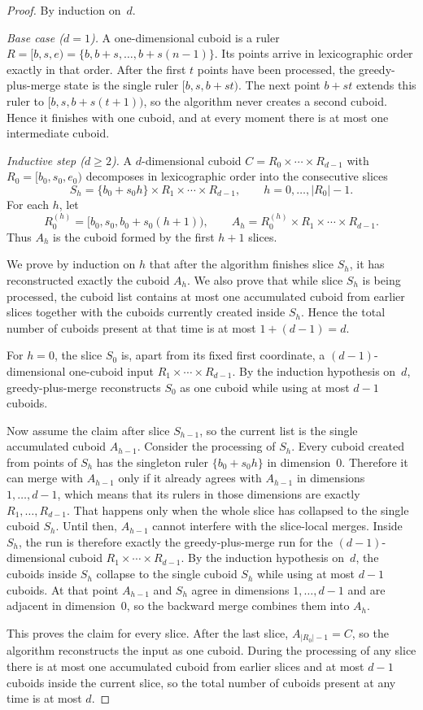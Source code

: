 \documentclass[manuscript,screen,review]{acmart}
\theoremstyle{definition}
\theoremstyle{plain}
\begin{document}
\begin{proof}
By induction on~$d$.

\emph{Base case ($d=1$).}
A one-dimensional cuboid is a ruler $R=[b,s,e)=\{b,b+s,\ldots,b+s(n-1)\}$. Its points arrive in lexicographic order exactly in that order. After the first $t$ points have been processed, the greedy-plus-merge state is the single ruler $[b,s,b+st)$. The next point $b+st$ extends this ruler to $[b,s,b+s(t+1))$, so the algorithm never creates a second cuboid. Hence it finishes with one cuboid, and at every moment there is at most one intermediate cuboid.

\emph{Inductive step ($d \geq 2$).}
A $d$-dimensional cuboid $C = R_0 \times \cdots \times R_{d-1}$ with $R_0=[b_0,s_0,e_0)$ decomposes in lexicographic order into the consecutive slices
\[
  S_h = \{b_0 + s_0 h\} \times R_1 \times \cdots \times R_{d-1},
  \qquad h=0,\ldots,|R_0|-1.
\]
For each $h$, let
\[
  R_0^{(h)} = [b_0,s_0,b_0+s_0(h+1)),
  \qquad
  A_h = R_0^{(h)} \times R_1 \times \cdots \times R_{d-1}.
\]
Thus $A_h$ is the cuboid formed by the first $h+1$ slices.

We prove by induction on $h$ that after the algorithm finishes slice
$S_h$, it has reconstructed exactly the cuboid $A_h$. We also prove
that while slice $S_h$ is being processed, the cuboid list contains at
most one accumulated cuboid from earlier slices together with the
cuboids currently created inside $S_h$. Hence the total number of
cuboids present at that time is at most $1+(d{-}1)=d$.

For $h=0$, the slice $S_0$ is, apart from its fixed first coordinate,
a $(d{-}1)$-dimensional one-cuboid input
$R_1 \times \cdots \times R_{d-1}$. By the induction hypothesis
on~$d$, greedy-plus-merge reconstructs $S_0$ as one cuboid while using
at most $d{-}1$ cuboids.

Now assume the claim after slice $S_{h-1}$, so the current list is the
single accumulated cuboid $A_{h-1}$. Consider the processing of $S_h$.
Every cuboid created from points of $S_h$ has the singleton ruler
$\{b_0+s_0 h\}$ in dimension~0. Therefore it can merge with
$A_{h-1}$ only if it already agrees with $A_{h-1}$ in dimensions
$1,\ldots,d-1$, which means that its rulers in those dimensions are
exactly $R_1,\ldots,R_{d-1}$. That happens only when the whole slice
has collapsed to the single cuboid $S_h$. Until then, $A_{h-1}$
cannot interfere with the slice-local merges. Inside $S_h$, the run is
therefore exactly the greedy-plus-merge run for the
$(d{-}1)$-dimensional cuboid $R_1 \times \cdots \times R_{d-1}$. By
the induction hypothesis on~$d$, the cuboids inside $S_h$ collapse to
the single cuboid $S_h$ while using at most $d{-}1$ cuboids. At that
point $A_{h-1}$ and $S_h$ agree in dimensions $1,\ldots,d-1$ and are
adjacent in dimension~0, so the backward merge combines them into
$A_h$.

This proves the claim for every slice. After the last slice, $A_{|R_0|-1}=C$, so the algorithm reconstructs the input as one cuboid. During the processing of any slice there is at most one accumulated cuboid from earlier slices and at most $d{-}1$ cuboids inside the current slice, so the total number of cuboids present at any time is at most $d$.
\end{proof}



\end{document}
